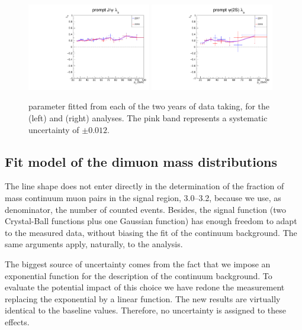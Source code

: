 \begin{figure}[h]
\centering
\includegraphics[width = 0.48\textwidth]{Figures/chapter6/par_lth_years_unc-jpsi.pdf}
\includegraphics[width = 0.48\textwidth]{Figures/chapter6/par_lth_years_unc-psip.pdf}
\caption{\lth parameter fitted from each of the two years of data taking, 
for the \jpsi (left) and \psip (right) analyses.
The pink band represents a systematic uncertainty of $\pm 0.012$.}
\label{fig:2017vs2018}
\end{figure}

\vfill\newpage

\subsection{Fit model of the dimuon mass distributions}

The \jpsi line shape does not enter directly 
in the determination of the fraction of mass continuum muon pairs 
in the signal region, 3.0--3.2\GeV,
because we use, as denominator, the number of counted events.
Besides, the signal function 
(two Crystal-Ball functions plus one Gaussian function) 
has enough freedom to adapt to the measured data, 
without biasing the fit of the continuum background.
The same arguments apply, naturally, to the \psip analysis.

The biggest source of uncertainty comes from the fact that we impose 
an exponential function for the description of the continuum background.
To evaluate the potential impact of this choice we have redone the \lth
measurement replacing the exponential by a linear function.
The new results are virtually identical to the baseline values.
Therefore, no uncertainty is assigned to these effects.

